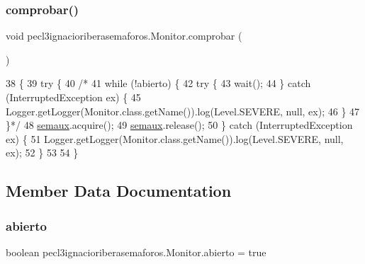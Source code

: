\subsubsection{\texorpdfstring{comprobar()}{comprobar()}}
{\footnotesize\ttfamily void pecl3ignacioriberasemaforos.\+Monitor.\+comprobar (\begin{DoxyParamCaption}{ }\end{DoxyParamCaption})\hspace{0.3cm}{\ttfamily [inline]}}


\begin{DoxyCode}
38                             \{
39         \textcolor{keywordflow}{try} \{
40             \textcolor{comment}{/*}
41 \textcolor{comment}{            while (!abierto) \{}
42 \textcolor{comment}{            try \{}
43 \textcolor{comment}{            wait();}
44 \textcolor{comment}{            \} catch (InterruptedException ex) \{}
45 \textcolor{comment}{            Logger.getLogger(Monitor.class.getName()).log(Level.SEVERE, null, ex);}
46 \textcolor{comment}{            \}}
47 \textcolor{comment}{            \}*/}
48             \mbox{\hyperlink{classpecl3ignacioriberasemaforos_1_1_monitor_add0c5e8d57580a613d07b14abac72354}{semaux}}.acquire();
49             \mbox{\hyperlink{classpecl3ignacioriberasemaforos_1_1_monitor_add0c5e8d57580a613d07b14abac72354}{semaux}}.release();
50         \} \textcolor{keywordflow}{catch} (InterruptedException ex) \{
51             Logger.getLogger(Monitor.class.getName()).log(Level.SEVERE, null, ex);
52         \}
53         
54     \}
\end{DoxyCode}


\subsection{Member Data Documentation}
\mbox{\label{classpecl3ignacioriberasemaforos_1_1_monitor_a45065f5df094d93eb9f369453e8ce5ec}} 
\subsubsection{\texorpdfstring{abierto}{abierto}}
{\footnotesize\ttfamily boolean pecl3ignacioriberasemaforos.\+Monitor.\+abierto = true\hspace{0.3cm}{\ttfamily [private]}}

